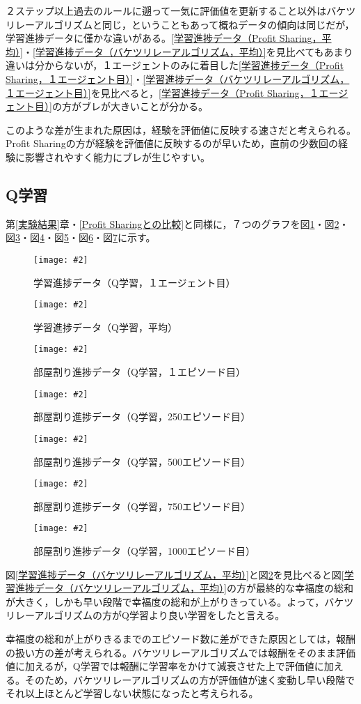 \documentclass[titlepage]{ltjsreport}
\newcommand{\image}[2]{\begin{figure}[h]\vspace{1em}\begin{center}\texttt{[image: \#2]}\caption{#1}\label{#1}\end{center}\end{figure}}
\begin{document}
２ステップ以上過去のルールに遡って一気に評価値を更新すること以外はバケツリレーアルゴリズムと同じ，ということもあって概ねデータの傾向は同じだが，学習進捗データに僅かな違いがある。\ref{学習進捗データ（Profit Sharing，平均）}・\ref{学習進捗データ（バケツリレーアルゴリズム，平均）}を見比べてもあまり違いは分からないが，１エージェントのみに着目した\ref{学習進捗データ（Profit Sharing，１エージェント目）}・\ref{学習進捗データ（バケツリレーアルゴリズム，１エージェント目）}を見比べると，\ref{学習進捗データ（Profit Sharing，１エージェント目）}の方がブレが大きいことが分かる。

このような差が生まれた原因は，経験を評価値に反映する速さだと考えられる。Profit Sharingの方が経験を評価値に反映するのが早いため，直前の少数回の経験に影響されやすく能力にブレが生じやすい。
\subsection{Q学習}
\label{Q学習との比較}
第\ref{実験結果}章・\ref{Profit Sharingとの比較}と同様に，７つのグラフを図\ref{学習進捗データ（Q学習，１エージェント目）}・図\ref{学習進捗データ（Q学習，平均）}・図\ref{部屋割り進捗データ（Q学習，１エピソード目）}・図\ref{部屋割り進捗データ（Q学習，250エピソード目）}・図\ref{部屋割り進捗データ（Q学習，500エピソード目）}・図\ref{部屋割り進捗データ（Q学習，750エピソード目）}・図\ref{部屋割り進捗データ（Q学習，1000エピソード目）}に示す。
\image{学習進捗データ（Q学習，１エージェント目）}{外部ファイル/学習進捗データ/Q学習/１エージェント目.png}
\image{学習進捗データ（Q学習，平均）}{外部ファイル/学習進捗データ/Q学習/平均.png}
\image{部屋割り進捗データ（Q学習，１エピソード目）}{外部ファイル/部屋割り進捗データ/Q学習/１エピソード目}
\image{部屋割り進捗データ（Q学習，250エピソード目）}{外部ファイル/部屋割り進捗データ/Q学習/250エピソード目}
\image{部屋割り進捗データ（Q学習，500エピソード目）}{外部ファイル/部屋割り進捗データ/Q学習/500エピソード目}
\image{部屋割り進捗データ（Q学習，750エピソード目）}{外部ファイル/部屋割り進捗データ/Q学習/750エピソード目}
\image{部屋割り進捗データ（Q学習，1000エピソード目）}{外部ファイル/部屋割り進捗データ/Q学習/1000エピソード目}

図\ref{学習進捗データ（バケツリレーアルゴリズム，平均）}と図\ref{学習進捗データ（Q学習，平均）}を見比べると図\ref{学習進捗データ（バケツリレーアルゴリズム，平均）}の方が最終的な幸福度の総和が大きく，しかも早い段階で幸福度の総和が上がりきっている。よって，バケツリレーアルゴリズムの方がQ学習より良い学習をしたと言える。

幸福度の総和が上がりきるまでのエピソード数に差ができた原因としては，報酬の扱い方の差が考えられる。バケツリレーアルゴリズムでは報酬をそのまま評価値に加えるが，Q学習では報酬に学習率をかけて減衰させた上で評価値に加える。そのため，バケツリレーアルゴリズムの方が評価値が速く変動し早い段階でそれ以上ほとんど学習しない状態になったと考えられる。
\end{document}
